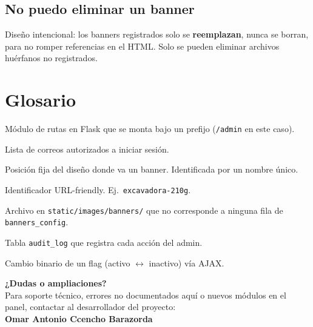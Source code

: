 \documentclass[11pt,a4paper]{article}
\begin{document}
\subsection{No puedo eliminar un banner}
Diseño intencional: los banners registrados solo se \textbf{reemplazan},
nunca se borran, para no romper referencias en el HTML. Solo se pueden
eliminar archivos huérfanos no registrados.

\section{Glosario}

\begin{description}[leftmargin=*]
    \item[Blueprint] Módulo de rutas en Flask que se monta bajo un
        prefijo (\texttt{/admin} en este caso).
    \item[Whitelist] Lista de correos autorizados a iniciar sesión.
    \item[Slot] Posición fija del diseño donde va un banner. Identificada
        por un nombre único.
    \item[Slug] Identificador URL-friendly. Ej.\ \texttt{excavadora-210g}.
    \item[Huérfano] Archivo en \texttt{static/images/banners/} que no
        corresponde a ninguna fila de \texttt{banners\_config}.
    \item[Audit log] Tabla \texttt{audit\_log} que registra cada acción
        del admin.
    \item[Toggle] Cambio binario de un flag (activo $\leftrightarrow$
        inactivo) vía AJAX.
\end{description}

\vspace{1cm}

\begin{tcolorbox}[
    colback=cgmgreen,
    colframe=cgmlime,
    boxrule=1pt,
    arc=4pt,
    coltext=white,
    left=14pt, right=14pt, top=12pt, bottom=12pt,
]
\begin{center}
\textbf{\Large¿Dudas o ampliaciones?}\\[0.3cm]
Para soporte técnico, errores no documentados aquí o nuevos módulos en
el panel, contactar al desarrollador del proyecto:\\[0.2cm]
\textbf{\color{cgmlime}\Large Omar Antonio Ccencho Barazorda}
\end{center}
\end{tcolorbox}
\end{document}
